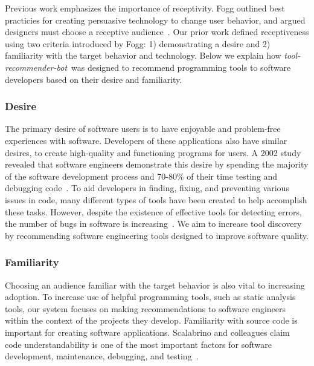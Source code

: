 \documentclass[conference]{IEEEtran}
\newcommand{\tool}{\textsl{tool-recommender-bot}}
\newcommand{\pseudosubsection}[1]{\vspace{2mm} \noindent{\it #1}}
\begin{document}
\pseudosubsection{Receptiveness}

Previous work emphasizes the importance of receptivity. Fogg outlined best practicies for creating persuasive technology to change user behavior, and argued designers must choose a receptive audience~\cite{FoggPersuasive}. Our prior work defined receptiveness using two criteria introduced by Fogg: 1) demonstrating a desire and 2) familiarity with the target behavior and technology. Below we explain how \tool~was designed to recommend programming tools to software developers based on their desire and familiarity. \\

\subsubsection{Desire}

The primary desire of software users is to have enjoyable and problem-free experiences with software. Developers of these applications also have similar desires, to create high-quality and functioning programs for users. A 2002 study revealed that software engineers demonstrate this desire by spending the majority of the software development process and 70-80\% of their time testing and debugging code~\cite{NIST}. To aid developers in finding, fixing, and preventing various issues in code, many different types of tools have been created to help accomplish these tasks. However, despite the existence of effective tools for detecting errors, the number of bugs in software is increasing~\cite{HaveThingsChanged}. We aim to increase tool discovery by recommending software engineering tools designed to improve software quality. \\

\subsubsection{Familiarity}

Choosing an audience familiar with the target behavior is also vital to increasing adoption. To increase use of helpful programming tools, such as static analysis tools, our system focuses on making recommendations to software engineers within the context of the projects they develop. Familiarity with source code is important for creating software applications. Scalabrino and colleagues claim code understandability is one of the most important factors for software development, maintenance, debugging, and testing~\cite{Scalabrino2017Understandability}.
\end{document}
